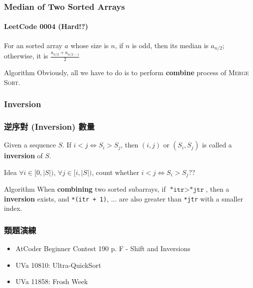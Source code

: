 \documentclass{beamer}
\begin{document}
\frame
{
	\frametitle{Median of Two Sorted Arrays}
	\framesubtitle{LeetCode 0004 (Hard!?)}
	
	\begin{definition}[Median]
		For an sorted array $a$ whose size is $n$, if $n$ is odd, then its median is $a_{n/ 2}$; otherwise, it is $\frac{a_{n/2} + a_{n/2 - 1}}{2}$
	\end{definition}
	\pause
	
	\begin{block}{Algorithm}
		Obviously, all we have to do is to perform \textbf{combine} process of \textsc{Merge Sort}.
	\end{block}
}

\subsubsection{Inversion}

\frame
{
	\frametitle{逆序對 (Inversion) 數量}
	
	\begin{definition}[Inversion]
		Given a sequence $S$. If $i < j \iff S_i > S_j$, then $(i, j)$ or $(S_i, S_j)$ is called a \textbf{inversion} of $S$.
	\end{definition}
	\pause
	
	\begin{block}{Idea}
		$\forall i \in [0, |S|)$, $\forall j \in [i, |S|)$, count whether $i < j \iff S_i > S_j$??
	\end{block}
	\pause
	
	\begin{block}{Algorithm}
		When \textbf{combining} two sorted subarrays, if $\texttt{*itr} > \texttt{*jtr}$, then a \textbf{inversion} exists, and \texttt{*(itr + 1)}, ... are also greater than \texttt{*jtr} with a smaller index.
	\end{block}
}

\frame
{
	\frametitle{類題演練}
	
	\begin{itemize}
		\item AtCoder Beginner Contest 190 p. F - Shift and Inversions
		\item UVa 10810: Ultra-QuickSort
		\item UVa 11858: Frosh Week
	\end{itemize}
}
\end{document}

